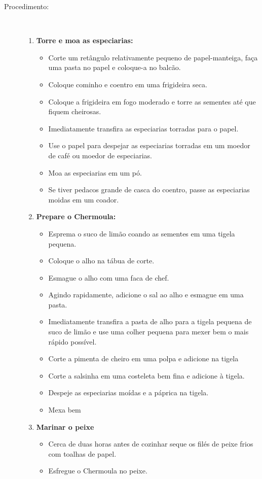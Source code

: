 \documentclass [11pt, papel de carta] {article}
\begin{document}
\begin {description}
\item [Procedimento:] \ \\
\begin {enumerate}
\item {\bf Torre e moa as especiarias:}
\begin {itemize}
\item Corte um retângulo relativamente pequeno de papel-manteiga, faça uma pasta no papel e coloque-a no balcão.
\item Coloque cominho e coentro em uma frigideira seca.
\item Coloque a frigideira em fogo moderado e torre as sementes até que fiquem cheirosas.
\item Imediatamente transfira as especiarias torradas para o papel.
\item Use o papel para despejar as especiarias torradas em um moedor de café ou moedor de especiarias.
\item Moa as especiarias em um pó.
\item Se tiver pedacos grande de casca do coentro, passe as especiarias moidas em um coador.
\end {itemize}
\item {\bf Prepare o Chermoula:}
\begin {itemize}
\item Esprema o suco de limão coando as sementes em uma tigela pequena.
\item Coloque o alho na tábua de corte.
\item Esmague o alho com uma faca de chef.
\item Agindo rapidamente, adicione o sal ao alho e esmague em uma pasta.
\item Imediatamente transfira a pasta de alho para a tigela pequena de suco de limão e use uma colher pequena para mexer bem o mais rápido possível.
\item Corte a pimenta de cheiro em uma polpa e adicione na tigela
\item Corte a salsinha em uma costeleta bem fina e adicione à tigela.
\item Despeje as especiarias moídas e a páprica na tigela.
\item Mexa bem
\end {itemize}
\item {\bf Marinar o peixe}
\begin {itemize}
\item Cerca de duas horas antes de cozinhar seque os filés de peixe frios com toalhas de papel.
\item Esfregue o Chermoula no peixe.

\end{itemize}
\end{enumerate}
\end{description}
\end{document}
